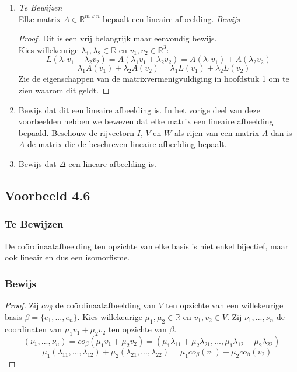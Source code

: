 \documentclass[lineaire_algebra_oplossingen.tex]{subfiles}
\begin{document}
\begin{enumerate}
\item 
\emph{Te Bewijzen}\\
Elke matrix $A \in \mathbb{R}^{m\times n}$ bepaalt een lineaire afbeelding.
\emph{Bewijs}\\
\begin{proof}
Dit is een vrij belangrijk maar eenvoudig bewijs.\\
Kies willekeurige $\lambda_1, \lambda_2 \in \mathbb{R}$ en $v_1,v_2 \in \mathbb{R}^3$:
\[
L(\lambda_1v_1+\lambda_2v_2) = A(\lambda_1v_1+\lambda_2v_2) = A(\lambda_1v_1)+A(\lambda_2v_2)
\]
\[
 = \lambda_1A(v_1)+\lambda_2A(v_2) =\lambda_1 L(v_1)+\lambda_2L(v_2)
\]
Zie de eigenschappen van de matrixvermenigvuldiging in hoofdstuk 1 om te zien waarom dit geldt.
\end{proof}

\item Bewijs dat dit een lineaire afbeelding is. In het vorige deel van deze voorbeelden hebben we bewezen dat elke matrix een lineaire afbeelding bepaald. Beschouw de rijvectorn $I$, $V$ en $W$ als rijen van een matrix $A$ dan is $A$ de matrix die de beschreven lineaire afbeelding bepaalt.

\item Bewijs dat $\Delta$ een lineare afbeelding is.

\end{enumerate}

\subsection{Voorbeeld 4.6}
\subsubsection*{Te Bewijzen}
De co\"ordinaatafbeelding ten opzichte van elke basis is niet enkel bijectief, maar ook lineair en dus een isomorfisme.
\subsubsection*{Bewijs}
\begin{proof}
Zij $co_{\beta}$ de co\"ordinaatafbeelding van $V$ ten opzichte van een willekeurige basis $\beta = \{e_1,...,e_n\}$.
Kies willekeurige $\mu_1,\mu_2 \in \mathbb{R}$ en $v_1,v_2 \in V$. Zij $\nu_1,...,\nu_n$ de coordinaten van $\mu_1v_1+\mu_2v_2$ ten opzichte van $\beta$.
\[
(\nu_1,...,\nu_n)
= co_{\beta}(\mu_1v_1+\mu_2v_2)
= (\mu_1\lambda_{11}+ \mu_2\lambda_{21},...,\mu_1\lambda_{12}+ \mu_2\lambda_{22})
\]
\[
= \mu_1(\lambda_{11},...,\lambda_{12})
+ \mu_2(\lambda_{21},...,\lambda_{22})
= \mu_1co_{\beta}(v_1)+\mu_2co_{\beta}(v_2)
\]
\end{proof}
\end{document}
